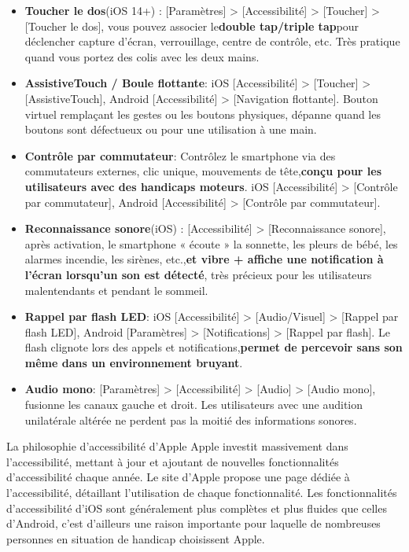 \begin{itemize}
  \item \textbf{Toucher le dos}(iOS 14+) : [Paramètres] > [Accessibilité] > [Toucher] > [Toucher le dos], vous pouvez associer le\textbf{double tap/triple tap}pour déclencher capture d'écran, verrouillage, centre de contrôle, etc. Très pratique quand vous portez des colis avec les deux mains.
  \item \textbf{AssistiveTouch / Boule flottante}: iOS [Accessibilité] > [Toucher] > [AssistiveTouch], Android [Accessibilité] > [Navigation flottante]. Bouton virtuel remplaçant les gestes ou les boutons physiques, dépanne quand les boutons sont défectueux ou pour une utilisation à une main.
  \item \textbf{Contrôle par commutateur}: Contrôlez le smartphone via des commutateurs externes, clic unique, mouvements de tête,\textbf{conçu pour les utilisateurs avec des handicaps moteurs}. iOS [Accessibilité] > [Contrôle par commutateur], Android [Accessibilité] > [Contrôle par commutateur].
  \item \textbf{Reconnaissance sonore}(iOS) : [Accessibilité] > [Reconnaissance sonore], après activation, le smartphone « écoute » la sonnette, les pleurs de bébé, les alarmes incendie, les sirènes, etc.,\textbf{et vibre + affiche une notification à l'écran lorsqu'un son est détecté}, très précieux pour les utilisateurs malentendants et pendant le sommeil.
  \item \textbf{Rappel par flash LED}: iOS [Accessibilité] > [Audio/Visuel] > [Rappel par flash LED], Android [Paramètres] > [Notifications] > [Rappel par flash]. Le flash clignote lors des appels et notifications,\textbf{permet de percevoir sans son même dans un environnement bruyant}.
  \item \textbf{Audio mono}: [Paramètres] > [Accessibilité] > [Audio] > [Audio mono], fusionne les canaux gauche et droit. Les utilisateurs avec une audition unilatérale altérée ne perdent pas la moitié des informations sonores.
\end{itemize}

\begin{tcbinfo}{La philosophie d'accessibilité d'Apple}
Apple investit massivement dans l'accessibilité, mettant à jour et ajoutant de nouvelles fonctionnalités d'accessibilité chaque année. Le site d'Apple propose une page dédiée à l'accessibilité, détaillant l'utilisation de chaque fonctionnalité. Les fonctionnalités d'accessibilité d'iOS sont généralement plus complètes et plus fluides que celles d'Android, c'est d'ailleurs une raison importante pour laquelle de nombreuses personnes en situation de handicap choisissent Apple.

\end{tcbinfo}

